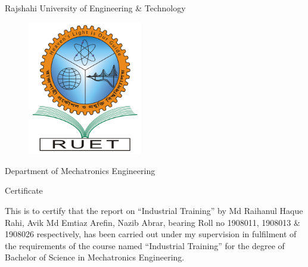 \begin{center}
    Rajshahi University of Engineering \& Technology
\end{center}
\begin{figure}[h!]
    \centering
    \includegraphics[width=5cm]{figs/RUET.png}
    \label{fig:ruet2}
\end{figure}
\setlength{\columnsep}{0.1\textwidth}

\begin{center}

Department of Mechatronics Engineering
 
Certificate 
\end{center}

This is to certify that the report on “Industrial Training” by Md Raihanul Haque Rahi, Avik Md Emtiaz Arefin, Nazib Abrar, bearing Roll no 1908011, 1908013 \& 1908026 respectively, has been carried out under my supervision in fulfilment of the requirements of the course named “Industrial Training” for the degree of Bachelor of Science in Mechatronics Engineering. 

